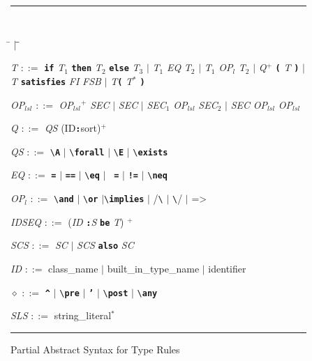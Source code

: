 \documentclass[12pt]{article} %
\newcommand{\reserved}[1]{\textbf{\texttt{#1}}} %
\newcommand{\UNSPACEFORBOX}{\vspace{-2ex}}
\newcommand{\HLINE}{\UNSPACEFORBOX%
\begin{flushleft}\rule{\textwidth}{0.01in}\end{flushleft}%
\UNSPACEFORBOX}
\newenvironment{BFIGURE}{

\begin{figure}
\small
\HLINE
}{
\HLINE
\normalsize
\end{figure}
}
\newcommand{\goesto}{\mbox{$::=$}}
\newcommand{\nonterm}[1]{\mbox{\it #1}}
\newenvironment{grammar}{
  \def\:{\goesto{}}
  \def\|{$\vert$}
  \tt \myobeycr%
  \begin{tabbing}%
  \qquad \= $\vert$ \= \qquad \= \kill%
}%
{\unskip\end{tabbing}}
\begin{document}
\begin{BFIGURE}
\begin{grammar}
\nonterm{T} \: \reserved{if} \nonterm{T$_1$} \reserved{then} \nonterm{T$_2$} \reserved{else} \nonterm{T$_3$} 
\> \| \> \nonterm{T$_1$} \nonterm{EQ} \nonterm{T$_2$}
\> \| \> \nonterm{T$_1$} \nonterm{OP$_{l}$} \nonterm{T$_2$}
\> \| \> \nonterm{Q}$^+$ \reserved{(} \nonterm{T} \reserved{)}
\> \| \> \nonterm{T} \reserved{satisfies} \nonterm{FI} \nonterm{FSB}
\> \| \> \nonterm{T}\reserved{(} \nonterm{T}$^*$ \reserved{)}

\nonterm{OP$_{lsl}$} \: \nonterm{OP$_{lsl}$$^+$} \nonterm{SEC}
\> \| \> \nonterm{SEC}
\> \| \> \nonterm{SEC$_1$} \nonterm{OP$_{lsl}$} \nonterm{SEC$_2$}
\> \| \> \nonterm{SEC} \nonterm{OP$_{lsl}$} \nonterm{OP$_{lsl}$}

\nonterm{Q} \: \nonterm{QS} (ID\reserved{:}sort)$^+$

\nonterm{QS} \: \verb|\|\reserved{A} \|  \verb|\|\reserved{forall} \| \verb|\|\reserved{E} \|  \verb|\|\reserved{exists}

\nonterm{EQ} \: \reserved{=} \| \reserved{==} \| \verb|\|\reserved{eq} \| \reserved{~=} \| \reserved{!=} \| \verb|\|\reserved{neq}

\nonterm{OP$_{l}$} \: \verb|\|\reserved{and} \| \verb|\|\reserved{or} \|\verb|\|\reserved{implies} \| /\verb|\| \| \verb|\|/ \| =>

\nonterm{IDSEQ} \:  (\nonterm{ID} \reserved{:}\nonterm{S} \reserved{be} \nonterm{T}) $^+$

\nonterm{SCS} \: \nonterm{SC} \| \nonterm{SCS} \reserved{also} \nonterm{SC}

\nonterm{ID} \: class\_name \|  built\_in\_type\_name \| identifier

\nonterm{$\diamond$} \: \reserved{\^} \| \verb|\|\reserved{pre} \| \reserved{'} \| \verb|\|\reserved{post} \| \verb|\|\reserved{any}

\nonterm{SLS} \: string\_literal$^*$

\end{grammar}
\caption{Partial Abstract Syntax for Type Rules}
\label{fig-abs}
\end{BFIGURE}
\end{document}

